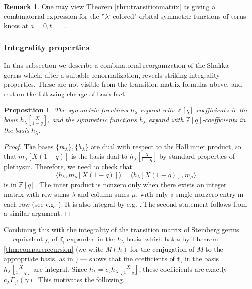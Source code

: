 \documentclass{amsart}
\numberwithin{equation}{section}
\newtheorem{proposition}[lemma]{Proposition}%
\theoremstyle{definition}
\newtheorem{remark}[lemma]{Remark}%
\def\tilde{\widetilde}
\renewcommand{\th}{\tilde{h}}
\newcommand{\fgamma}{\mathbf{f}_{\gamma}}
\newcommand{\Z}{{\mathbb Z}}
\begin{document}
\begin{remark}
One may view Theorem \ref{thm:transitionmatrix} as giving a combinatorial expression for the ''$\lambda'$-colored" orbital symmetric functions of torus knots at $a=0, t=1$.
\end{remark}

\subsubsection{Integrality properties}
In this subsection we describe a combinatorial reorganization of the Shalika germs which, after a suitable renormalization, reveals striking integrality properties. These are not visible from the transition-matrix formulas above, and rest on the following change-of-basis fact.
\begin{proposition}
\label{prop:changebasis}
The symmetric functions $h_\lambda$ expand with $\Z[q]$-coefficients in the basis $h_\lambda\left[\frac{X}{1-q}\right]$, and the symmetric functions $\th_\lambda$ expand with $\Z[q]$-coefficients in the basis $h_\lambda$.
\end{proposition}
\begin{proof}
The bases $\{m_\lambda\},\{h_\lambda\}$ are dual with respect to the Hall inner product, so that $m_\lambda[X(1-q)]$ is the basis dual to $h_\lambda\left[\frac{X}{1-q}\right]$ by standard properties of plethysm.
Therefore, we need to check that 
$$\langle h_\lambda, m_\mu[X(1-q)]\rangle=\langle h_\lambda[X(1-q)],m_\mu\rangle$$ is in $\Z[q]$. The inner product is nonzero only when there exists an integer matrix with row sums $\lambda$ and column sums $\mu$, with only a single nonzero entry in each row (see e.g. \cite[3.17.]{Zelevinsky}). It is also integral by e.g. \cite[p. 52]{HaimanCDM}. The second statement follows from a similar argument.
\end{proof}

Combining this with the integrality of the transition matrix of Steinberg germs --- equivalently, of $\fgamma$ expanded in the $h_\lambda$-basis, which holds by Theorem \ref{thm:comparerecursion} (we write $M(h)$ for the conjugation of $M$ to the appropriate basis, as in \cite{ReEc}) --- shows that the coefficients of $\fgamma$ in the basis $h_\lambda\left[\frac{X}{1-q}\right]$ are integral. Since $\th_\lambda=c_\lambda h_\lambda\left[\frac{X}{1-q}\right]$, these coefficients are exactly $c_\lambda \Gamma_{\lambda^t}(\gamma)$. This motivates the following.
\end{document}
